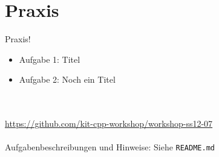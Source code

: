 \section{Praxis}
\begin{frame}[fragile]{Praxis!}
	\begin{itemize}
		\item Aufgabe 1: Titel
		\item Aufgabe 2: Noch ein Titel
	\end{itemize}
	\ \\
	\ \\
	\large{\url{https://github.com/kit-cpp-workshop/workshop-ss12-07}} \\
	\ \\
	Aufgabenbeschreibungen und Hinweise: Siehe \verb|README.md|

\end{frame}
